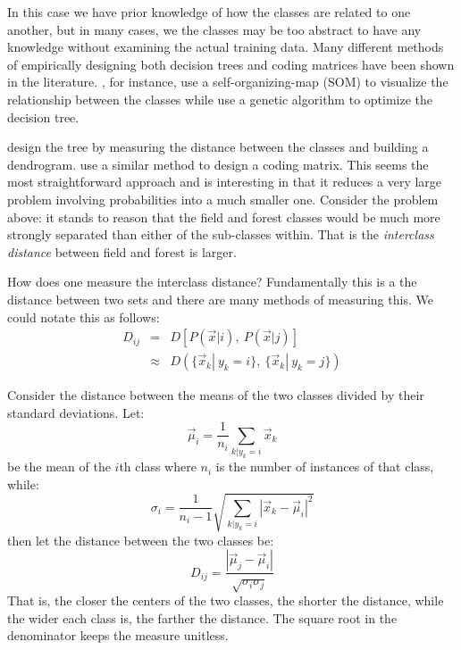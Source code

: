 \documentclass{article}
\begin{document}
In this case we have prior knowledge of how the classes are related to one another,
but in many cases, we the classes may be too abstract to have any knowledge without examining the actual training data.
Many different methods of empirically designing both decision trees and coding matrices have been shown in the literature.
\citet{Cheong_etal2004}, for instance, use a self-organizing-map (SOM)
\cite{Kohonen2000} to visualize the relationship between the classes while
\citet{Lee_Oh2003} use a genetic algorithm to optimize the decision tree.

\citet{Benabdeslem_Bennani2006} design the tree by measuring the distance between
the classes and building a dendrogram.
\citet{Zhou_etal2008} use a similar method to design a coding matrix.
This seems the most straightforward approach and is interesting in that it reduces a very large problem involving probabilities into a much smaller one.
Consider the problem above: it stands to reason that the field and forest classes would be much more strongly separated than either of the sub-classes within.
That is the {\it interclass distance} between field and forest is larger.

How does one measure the interclass distance? Fundamentally this is a the distance between two sets and there are many methods of measuring this.
We could notate this as follows:
\begin{eqnarray}
	D_{ij} & = & D\left [P(\vec x|i),~P(\vec x|j)\right ] \\
	       & \approx & D\left (\lbrace \vec x_k|~y_k=i \rbrace,~\lbrace \vec x_k|~y_k=j\rbrace \right )
\end{eqnarray}

Consider the distance between the means of the two classes divided by their standard deviations. Let:
\begin{equation}
	\vec \mu_i = \frac{1}{n_i} \sum_{k|y_k=i} \vec x_k
\end{equation}
be the mean of the $i$th class where $n_i$ is the number of instances of that class, while:
\begin{equation}
	\sigma_i = \frac{1}{n_i-1}\sqrt{\sum_{k|y_k=i}|\vec x_k - \vec \mu_i|^2}
\end{equation}
then let the distance between the two classes be:
\begin{equation}
	D_{ij}=\frac{|\vec \mu_j - \vec \mu_i |}{\sqrt{\sigma_i \sigma_j}}
\end{equation}
That is, the closer the centers of the two classes, the shorter the distance, while the wider each class is, the farther the distance.
The square root in the denominator keeps the measure unitless.
	
\end{document}
